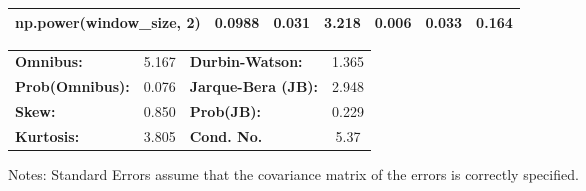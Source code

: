 \begin{center}
\begin{tabular}{lcccccc}
\textbf{np.power(window\_size, 2)}            &       0.0988  &        0.031     &     3.218  &         0.006        &        0.033    &        0.164     \\
\bottomrule
\end{tabular}
\begin{tabular}{lclc}
\textbf{Omnibus:}       &  5.167 & \textbf{  Durbin-Watson:     } &    1.365  \\
\textbf{Prob(Omnibus):} &  0.076 & \textbf{  Jarque-Bera (JB):  } &    2.948  \\
\textbf{Skew:}          &  0.850 & \textbf{  Prob(JB):          } &    0.229  \\
\textbf{Kurtosis:}      &  3.805 & \textbf{  Cond. No.          } &     5.37  \\
\bottomrule
\end{tabular}
\end{center}

Notes: \newline
 [1] Standard Errors assume that the covariance matrix of the errors is correctly specified.